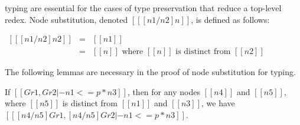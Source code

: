 typing are essential for the cases of type preservation that reduce a
top-level redex. Node substitution, denoted $[[ [n1/n2]n]]$, is defined as
follows: 
\begin{center}
  \begin{math}
    \begin{array}{lll}
      [[ [n1/n2] n2 ]] & = & [[n1]]\\
      [[ [n1/n2] n  ]] & = & [[n]] \text{ where } [[n]] \text{ is
        distinct from } [[n2]]
    \end{array}
  \end{math}
\end{center}
The following lemmas are necessary in the proof of node substitution
for typing.
\begin{lemma}
  \label{lemma:renaming_nodes_in_graph}
  If $[[Gr1, Gr2 |- n1 <=p* n3]]$, then for any nodes $[[n4]]$ and
  $[[n5]]$, where $[[n5]]$ is distinct from $[[n1]]$ and $[[n3]]$,
  we have $[[ [n4/n5]Gr1, [n4/n5]Gr2 |- n1 <=p* n3]]$.
\end{lemma}
